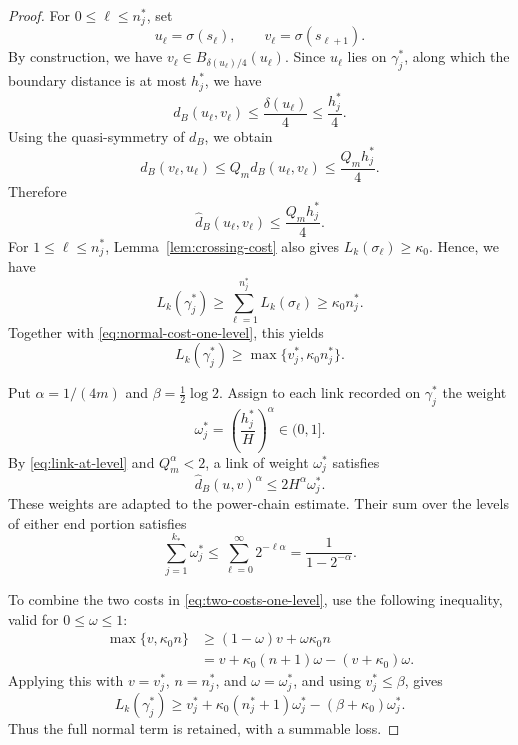 \documentclass[11pt]{article}
\theoremstyle{definition}
\begin{document}
\begin{proof}
For \(0\le\ell\le n_j^\ast\), set
\[
u_\ell=\sigma(s_\ell),
\qquad
v_\ell=\sigma(s_{\ell+1}).
\]
By construction, we have
\(v_\ell\in B_{\delta(u_\ell)/4}(u_\ell)\).
Since \(u_\ell\) lies on \(\gamma_j^\ast\), along which the boundary
distance is at most \(h_j^\ast\), we have
\[
d_B(u_\ell,v_\ell)
\le
\frac{\delta(u_\ell)}4
\le
\frac{h_j^\ast}{4}.
\]
Using the quasi-symmetry of \(d_B\), we obtain
\[
d_B(v_\ell,u_\ell)
\le
Q_m d_B(u_\ell,v_\ell)
\le
\frac{Q_mh_j^\ast}{4}.
\]
Therefore
\begin{equation}\label{eq:link-at-level}
	\widehat d_B(u_\ell,v_\ell)
	\le
	\frac{Q_mh_j^\ast}{4}.
\end{equation}
For \(1\le\ell\le n_j^\ast\),
Lemma~\ref{lem:crossing-cost} also gives
\(
L_k(\sigma_\ell)\ge\kappa_0.
\)
Hence, we have
\[
L_k(\gamma_j^\ast)
\ge
\sum_{\ell=1}^{n_j^\ast}L_k(\sigma_\ell)
\ge
\kappa_0 n_j^\ast.
\]
Together with \eqref{eq:normal-cost-one-level}, this yields
\begin{equation}\label{eq:two-costs-one-level}
	L_k(\gamma_j^\ast)
	\ge
	\max\{v_j^\ast,\kappa_0 n_j^\ast\}.
\end{equation}



Put \(\alpha=1/(4m)\) and \(\beta=\frac12\log2\).
Assign to each link recorded on \(\gamma_j^\ast\) the weight
\[
\omega_j^\ast=\left(\frac{h_j^\ast}{H}\right)^\alpha\in(0,1].
\]
By \eqref{eq:link-at-level} and \(Q_m^\alpha<2\), a link of
weight \(\omega_j^\ast\) satisfies
\[
\widehat d_B(u,v)^\alpha\le2H^\alpha\omega_j^\ast.
\]
These weights are adapted to the power-chain estimate. Their sum over
the levels of either end portion satisfies
\[
\sum_{j=1}^{k_\ast}\omega_j^\ast
\le\sum_{\ell=0}^{\infty}2^{-\ell\alpha}
=\frac1{1-2^{-\alpha}}.
\]

To combine the two costs in \eqref{eq:two-costs-one-level}, use the
following inequality, valid for \(0\le\omega\le1\):
\begin{equation}\label{eq:layer-budget}
\begin{aligned}
\max\{v,\kappa_0n\}
&\ge(1-\omega)v+\omega\kappa_0n\\
&=v+\kappa_0(n+1)\omega-(v+\kappa_0)\omega.
\end{aligned}
\end{equation}
Applying this with \(v=v_j^\ast\), \(n=n_j^\ast\), and
\(\omega=\omega_j^\ast\), and using \(v_j^\ast\le\beta\), gives
\begin{equation}\label{eq:weighted-layer-cost}
L_k(\gamma_j^\ast)
\ge v_j^\ast+\kappa_0(n_j^\ast+1)\omega_j^\ast
-(\beta+\kappa_0)\omega_j^\ast.
\end{equation}
Thus the full normal term is retained, with a summable loss.


\end{proof}
\end{document}
